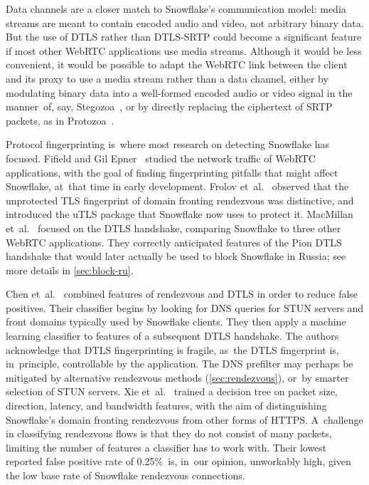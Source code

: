 \documentclass[letterpaper,twocolumn]{article}
\begin{document}
\begin{description}
Data channels are a closer match to Snowflake's communication model:
media streams are meant to contain encoded audio and video,
not arbitrary binary data.
But the use of DTLS rather than DTLS-SRTP could become
a significant feature if most other WebRTC applications use media streams.
Although it would be less convenient,
it would be possible to adapt the WebRTC link between
the client and its proxy
to use a media stream rather than a data channel,
either by modulating binary data into a well-formed encoded
audio or video signal in the manner~of, say,
Stegozoa~\cite[\S 3.3]{Figueira2022a},
or by directly replacing the ciphertext of SRTP packets,
as in Protozoa~\cite[\S 4.4]{Barradas2020a}.

\end{description}

Protocol fingerprinting
is~where most research on detecting Snowflake has focused.
Fifield and Gil Epner~\cite{arxiv.1605.08805}
studied the network traffic of WebRTC applications,
with the goal of finding fingerprinting pitfalls
that might affect Snowflake, at~that time in early development.
Frolov et~al.~\cite[\S \mbox{V-C}]{Frolov2019a}
observed that the unprotected TLS fingerprint
of domain fronting rendezvous was distinctive,
and introduced the uTLS package that Snowflake
now uses to protect it.
MacMillan et~al.~\cite{arxiv.2008.03254}
focused on the DTLS handshake,
comparing Snowflake to three other WebRTC applications.
They correctly anticipated features
of the Pion DTLS handshake
that would later actually be used
to block Snowflake in Russia;
see more details in \autoref{sec:block-ru}.

Chen et~al.~\cite{Chen2023a}
combined features
of rendezvous and DTLS
in order to reduce false positives.
Their classifier begins
by looking for DNS queries for
STUN servers and front domains typically used by Snowflake clients.
They then apply a machine learning classifier
to features of a subsequent DTLS handshake.
The authors acknowledge that DTLS fingerprinting
is fragile, as~the DTLS fingerprint is, in~principle,
controllable by the application.
The DNS prefilter may perhaps be mitigated
by alternative rendezvous methods (\autoref{sec:rendezvous}),
or~by smarter selection of STUN servers.
Xie et~al.~\cite{Xie2023a} trained a decision tree on
packet size, direction, latency, and bandwidth features, with the aim of
distinguishing Snowflake's domain fronting rendezvous
from other forms of HTTPS.
A~challenge in classifying rendezvous flows
is that they do not consist of many packets,
limiting the number of features a classifier has to work with.
Their lowest reported false positive rate of 0.25\%~is,
in~our opinion, unworkably high,
given the low base rate of Snowflake rendezvous connections.
\end{document}
